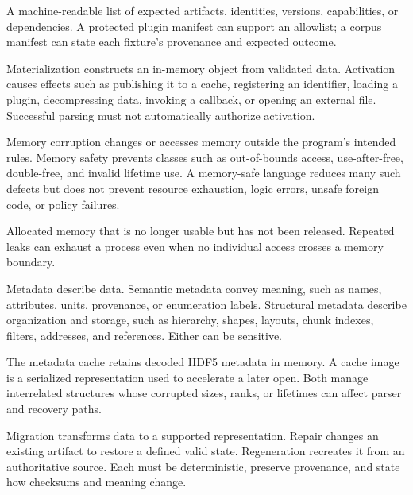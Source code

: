 \documentclass[../main.tex]{subfiles}
\begin{document}
\begin{description}[leftmargin=1.5em,style=nextline]
\item[Manifest.]
A machine-readable list of expected artifacts, identities, versions,
capabilities, or dependencies. A protected plugin manifest can support an
allowlist; a corpus manifest can state each fixture's provenance and expected
outcome.

\item[Materialization / activation.]
Materialization constructs an in-memory object from validated data. Activation
causes effects such as publishing it to a cache, registering an identifier,
loading a plugin, decompressing data, invoking a callback, or opening an
external file. Successful parsing must not automatically authorize activation.

\item[Memory corruption / memory safety.]
Memory corruption changes or accesses memory outside the program's intended
rules. Memory safety prevents classes such as out-of-bounds access,
use-after-free, double-free, and invalid lifetime use. A memory-safe language
reduces many such defects but does not prevent resource exhaustion, logic
errors, unsafe foreign code, or policy failures.

\item[Memory leak.]
Allocated memory that is no longer usable but has not been released. Repeated
leaks can exhaust a process even when no individual access crosses a memory
boundary.

\item[Metadata / semantic metadata / structural metadata.]
Metadata describe data. Semantic metadata convey meaning, such as names,
attributes, units, provenance, or enumeration labels. Structural metadata
describe organization and storage, such as hierarchy, shapes, layouts, chunk
indexes, filters, addresses, and references. Either can be sensitive.

\item[Metadata cache / cache image.]
The metadata cache retains decoded HDF5 metadata in memory. A cache image is a
serialized representation used to accelerate a later open. Both manage
interrelated structures whose corrupted sizes, ranks, or lifetimes can affect
parser and recovery paths.

\item[Migration / repair / regeneration.]
Migration transforms data to a supported representation. Repair changes an
existing artifact to restore a defined valid state. Regeneration recreates it
from an authoritative source. Each must be deterministic, preserve provenance,
and state how checksums and meaning change.


\end{description}
\end{document}
